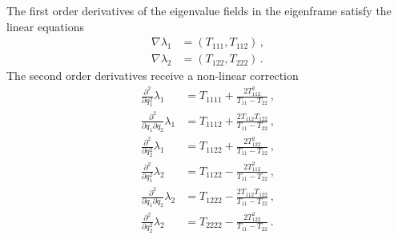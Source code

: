 \documentclass[a4paper, 11pt]{article}
\begin{document}
The first order derivatives of the eigenvalue fields in the eigenframe satisfy the linear equations
\begin{align}
\nabla \lambda_1&= (T_{111}, T_{112})\,,\\
\nabla \lambda_2&= (T_{122}, T_{222})\,.
\end{align}
The second order derivatives receive a non-linear correction
\begin{align}
\frac{\partial^2}{\partial q_1^2} \lambda_1&= T_{1111} + \frac{2 T_{112}^2}{T_{11}-T_{22}}\,,\\
\frac{\partial^2}{\partial q_1 \partial q_2} \lambda_1&= T_{1112} + \frac{2 T_{112}T_{122}}{T_{11}-T_{22}}\,,\\
\frac{\partial^2}{\partial q_2^2} \lambda_1&= T_{1122} + \frac{2T_{122}^2}{T_{11}-T_{22}}\,,\\
\frac{\partial^2}{\partial q_1^2} \lambda_2&= T_{1122} - \frac{2 T_{112}^2}{T_{11}-T_{22}}\,,\\
\frac{\partial^2}{\partial q_1 \partial q_2} \lambda_2&= T_{1222} - \frac{2 T_{112}T_{122}}{T_{11}-T_{22}}\,,\\
\frac{\partial^2}{\partial q_2^2} \lambda_2&= T_{2222} - \frac{2T_{122}^2}{T_{11}-T_{22}}\,.
\end{align}
\end{document}
